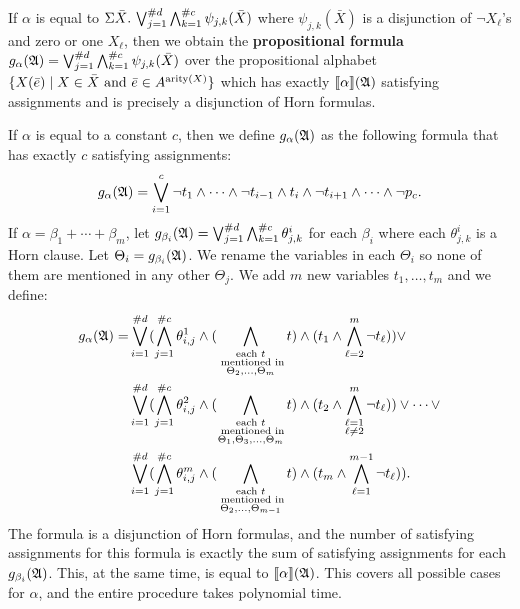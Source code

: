 If $\alpha$ is equal to $\Sigma{\bar{X}}.\,\bigvee_{j = 1}^{\#d}\bigwedge_{k = 1}^{\#c}\psi_{j,k}(\bar{X})$ where $\psi_{j,k}(\bar{X})$ is a disjunction of $\neg X_{\ell}$'s and zero or one $X_{\ell}$, then we obtain the {\bf propositional formula} $g_{\alpha}(\mathfrak{A}) = \bigvee_{j = 1}^{\#d}\bigwedge_{k = 1}^{\#c}\psi_{j,k}(\bar{X})$ over the propositional alphabet $\{X(\bar{e}) \mid X \in \bar{X} \text{ and } \bar{e}\in A^{{\rm arity}(X)} \}$ which has exactly ${\llbracket{}{\alpha}\rrbracket}(\mathfrak{A})$ satisfying assignments and is precisely a disjunction of Horn formulas.

If $\alpha$ is equal to a constant $c$, then we define $g_{\alpha}(\mathfrak{A})$ as the following formula that has exactly $c$ satisfying assignments:
$$
g_{\alpha}(\mathfrak{A}) = \bigvee_{i = 1}^{c}\neg t_1 \wedge \cdots \wedge \neg t_{i-1} \wedge t_i \wedge \neg t_{i+1} \wedge \cdots \wedge \neg p_c.
$$ 
If $\alpha = \beta_1 + \cdots + \beta_m$, let $g_{\beta_i}(\mathfrak{A}) = \bigvee_{j = 1}^{\#d}\bigwedge_{k = 1}^{\#c}\theta^i_{j,k}$ for each $\beta_i$ where each $\theta^i_{j,k}$ is a Horn clause. Let $\Theta_i = g_{\beta_i}(\mathfrak{A})$. We rename the variables in each $\Theta_i$ so none of them are mentioned in any other $\Theta_j$. We add $m$ new variables $t_1,\ldots,t_m$ and we define:
\begin{align*}
g_{\alpha}(\mathfrak{A}) = &\bigvee_{i = 1}^{\#d}(\bigwedge_{j = 1}^{\#c}\theta^1_{i,j} \wedge (\bigwedge\limits_{\substack{\text{each } t\\ \text{ mentioned in}\\ \Theta_2,\ldots,\Theta_{m}}}t) \wedge (t_1 \wedge \bigwedge_{\ell = 2}^{m} \neg t_{\ell})) \vee \\ 
&\bigvee_{i = 1}^{\#d}(\bigwedge_{j = 1}^{\#c}\theta^2_{i,j} \wedge (\bigwedge\limits_{\substack{\text{each $t$}\\ \text{ mentioned in}\\ \Theta_1,\Theta_3,\ldots,\Theta_{m}}}t) \wedge (t_2 \wedge \bigwedge\limits_{\substack{\ell = 1 \\ \ell \neq 2}}^{m} \neg t_{\ell})) \vee \cdots \vee\\ 
&\bigvee_{i = 1}^{\#d}(\bigwedge_{j = 1}^{\#c}\theta^m_{i,j} \wedge (\bigwedge\limits_{\substack{\text{each } t\\ \text{ mentioned in}\\ \Theta_2,\ldots,\Theta_{m-1}}}t) \wedge (t_m \wedge \bigwedge_{\ell = 1}^{m-1} \neg t_{\ell})).
\end{align*}
The formula is a disjunction of Horn formulas, and the number of satisfying assignments for this formula is exactly the sum of satisfying assignments for each $g_{\beta_i}(\mathfrak{A})$. This, at the same time, is equal to ${\llbracket{}{\alpha}\rrbracket}(\mathfrak{A})$. This covers all possible cases for $\alpha$, and the entire procedure takes polynomial time.